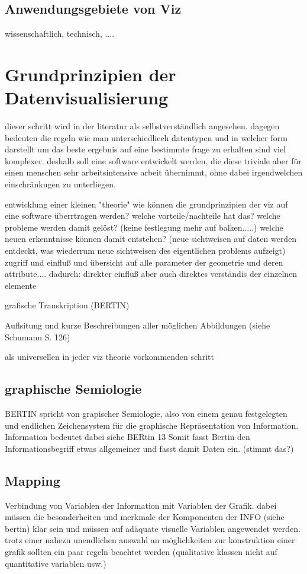\documentclass[a4paper, 12pt, onepage, pdftex, headsepline, footsepline]{scrreprt}
\begin{document}
\subsection{Anwendungsgebiete von Viz}
wissenschaftlich, technisch, ....
\section{Grundprinzipien der Datenvisualisierung}

dieser schritt wird in der literatur als selbstverständlich angesehen. dagegen bedeuten die regeln wie man unterschiedliceh datentypen und in welcher form darstellt um das beste ergebnis auf eine bestimmte frage zu erhalten sind viel komplexer.
deshalb soll eine software entwickelt werden, die diese triviale aber für einen menschen sehr arbeitsintensive arbeit übernimmt, ohne dabei irgendwelchen einschränkugen zu unterliegen.

entwicklung einer kleinen "theorie"
wie können die grundprinzipien der viz auf eine software überrtragen werden?
welche vorteile/nachteile hat das?
welche probleme werden damit gelöst? (keine festlegung mehr auf balken.....)
welche neuen erkenntnisse können damit entstehen? (neue sichtweisen auf daten werden entdeckt, was wiederrum neue sichtweisen des eigentlichen problems aufzeigt)
zugriff und einfluß und übersicht auf alle parameter der geometrie und deren attribute....
dadurch: direkter einfluß aber auch direktes verständis der einzelnen elemente

grafische Transkription (BERTIN)

Auflsitung und kurze Beschreibungen aller möglichen Abbildungen (siehe Schumann S. 126)

als universellen in jeder viz theorie vorkommenden schritt
\subsection{graphische Semiologie}
BERTIN spricht von grapischer Semiologie, also von einem genau festgelegten und endlichen Zeichensystem für die graphische Repräsentation von Information.
Information bedeutet dabei siehe BERtin 13 Somit fasst Bertin den Informationsbegriff etwas allgemeiner und fasst damit Daten ein. (stimmt das?)
\subsection{Mapping}

Verbindung von Variablen der Information mit Variablen der Grafik.
dabei müssen die besonderheiten und merkmale der Komponenten der INFO (siehe bertin) klar sein und müssen auf adäquate visuelle Variablen angewendet werden.
trotz einer nahezu unendlichen auswahl an möglichkeiten zur konstruktion einer grafik sollten ein paar regeln beachtet werden (qualitative klassen nicht auf quantitative variablen usw.)
\end{document}
